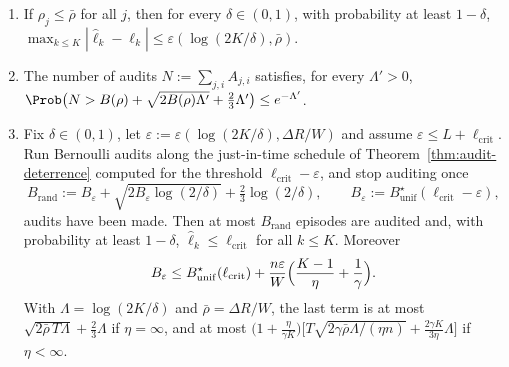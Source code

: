 \begin{theorem}\label{thm:audit-random}
\begin{enumerate}
\item[\textup{(a)}] If $\rho_j\le\bar\rho$ for all $j$, then for every
$\delta\in(0,1)$, with probability at least $1-\delta$,
$\max_{k\le K}|\hat\ell_k-\ell_k|\le\varepsilon(\log(2K/\delta),\bar\rho)$.
\item[\textup{(b)}] The number of audits $N:=\sum_{j,i}A_{j,i}$ satisfies, for
every $\Lambda'>0$,
$\Prob\bigl(N>B(\rho)+\sqrt{2B(\rho)\Lambda'}+\tfrac23\Lambda'\bigr)\le e^{-\Lambda'}$.
\item[\textup{(c)}] Fix $\delta\in(0,1)$, let
$\varepsilon:=\varepsilon(\log(2K/\delta),\Delta R/W)$ and assume
$\varepsilon\le L+\ell_{\mathrm{crit}}$. Run Bernoulli audits along the
just-in-time schedule of Theorem~\ref{thm:audit-deterrence} computed for the
threshold $\ell_{\mathrm{crit}}-\varepsilon$, and stop auditing once
\[
  B_{\mathrm{rand}}:=B_\varepsilon+\sqrt{2B_\varepsilon\log(2/\delta)}+\tfrac23\log(2/\delta),
  \qquad B_\varepsilon:=B^\star_{\mathrm{unif}}(\ell_{\mathrm{crit}}-\varepsilon),
\]
audits have been made. Then at most $B_{\mathrm{rand}}$ episodes are audited
and, with probability at least $1-\delta$,
$\hat\ell_k\le\ell_{\mathrm{crit}}$ for all $k\le K$. Moreover
\begin{equation}\label{eq:audit-inflation}
  B_\varepsilon\le B^\star_{\mathrm{unif}}(\ell_{\mathrm{crit}})
  +\frac{n\varepsilon}{W}\Bigl(\frac{K-1}{\eta}+\frac1\gamma\Bigr).
\end{equation}
With $\Lambda=\log(2K/\delta)$ and $\bar\rho=\Delta R/W$, the last term is at
most $\sqrt{2\bar\rho\,T\Lambda}+\tfrac23\Lambda$ if $\eta=\infty$, and at most
$\bigl(1+\tfrac{\eta}{\gamma K}\bigr)\bigl[T\sqrt{2\gamma\bar\rho\Lambda/(\eta n)}
+\tfrac{2\gamma K}{3\eta}\Lambda\bigr]$ if $\eta<\infty$.
\end{enumerate}
\end{theorem}

